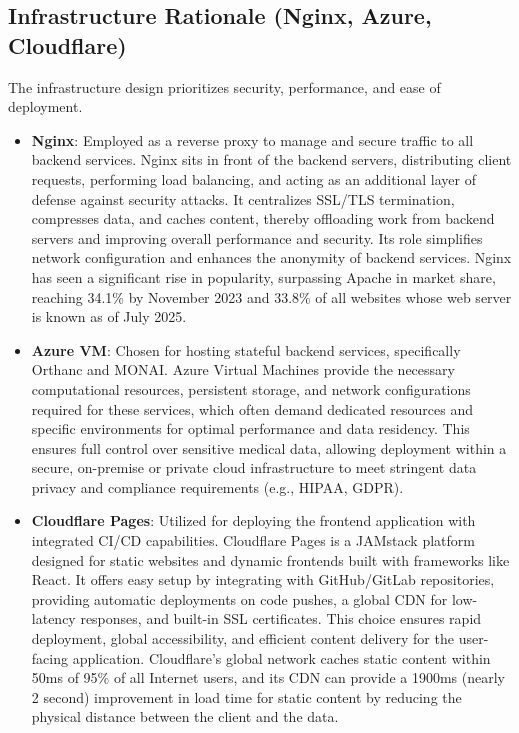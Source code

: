 \subsection{Infrastructure Rationale (Nginx, Azure, Cloudflare)}
The infrastructure design prioritizes security, performance, and ease of deployment.

\begin{itemize}
    \item \textbf{Nginx}: Employed as a reverse proxy to manage and secure traffic to all backend services. Nginx sits in front of the backend servers, distributing client requests, performing load balancing, and acting as an additional layer of defense against security attacks. It centralizes SSL/TLS termination, compresses data, and caches content, thereby offloading work from backend servers and improving overall performance and security. Its role simplifies network configuration and enhances the anonymity of backend services. Nginx has seen a significant rise in popularity, surpassing Apache in market share, reaching 34.1\% by November 2023 and 33.8\% of all websites whose web server is known as of July 2025.
    \item \textbf{Azure VM}: Chosen for hosting stateful backend services, specifically Orthanc and MONAI. Azure Virtual Machines provide the necessary computational resources, persistent storage, and network configurations required for these services, which often demand dedicated resources and specific environments for optimal performance and data residency. This ensures full control over sensitive medical data, allowing deployment within a secure, on-premise or private cloud infrastructure to meet stringent data privacy and compliance requirements (e.g., HIPAA, GDPR).
    \item \textbf{Cloudflare Pages}: Utilized for deploying the frontend application with integrated CI/CD capabilities. Cloudflare Pages is a JAMstack platform designed for static websites and dynamic frontends built with frameworks like React. It offers easy setup by integrating with GitHub/GitLab repositories, providing automatic deployments on code pushes, a global CDN for low-latency responses, and built-in SSL certificates. This choice ensures rapid deployment, global accessibility, and efficient content delivery for the user-facing application. Cloudflare's global network caches static content within 50ms of 95\% of all Internet users, and its CDN can provide a 1900ms (nearly 2 second) improvement in load time for static content by reducing the physical distance between the client and the data.
\end{itemize}

